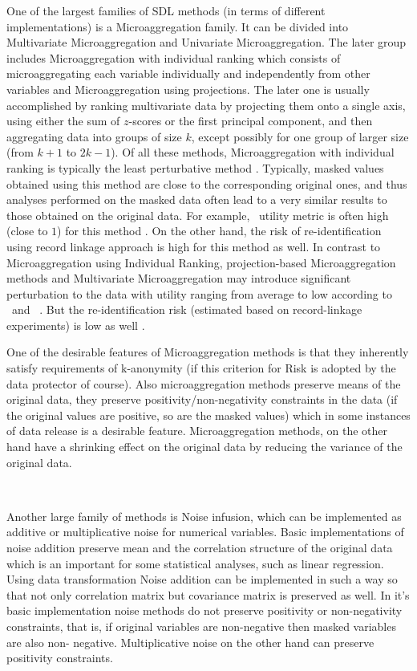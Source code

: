 \documentclass[12pt]{article}
\begin{document}
One of the largest families of SDL methods (in terms of different  implementations) is a  Microaggregation family. It can   be divided into Multivariate Microaggregation   and  Univariate Microaggregation. The later group includes Microaggregation with individual ranking which consists of microaggregating each variable individually and independently from other variables and Microaggregation using projections. The later one is usually accomplished by ranking  multivariate data by projecting them onto a single axis, using either the sum of $z$-scores or the first principal component, and then aggregating data into groups of size $k$, except possibly for one group of larger size (from $k+1$ to $2k -1$).
Of all these methods, Microaggregation with individual ranking is typically the least perturbative method \citep{kkors06}. Typically, masked values obtained using this method are close to the corresponding original ones, and thus analyses performed on the masked data often lead to a very similar results to those obtained on the original data. For example, \EO\ utility metric is often high (close to $1$)  for this method \citep{kkors06}. On the other hand, the risk of re-identification using record linkage approach is high for this method as well. 
In contrast to Microaggregation using Individual Ranking, projection-based Microaggregation methods and Multivariate Microaggregation may introduce significant perturbation to the data with utility ranging from average to low according to \IO\ and \EO\ . But the re-identification risk (estimated based on record-linkage experiments) is low as well \citep{}. 

One of the desirable features of Microaggregation methods is that they  inherently satisfy requirements of k-anonymity (if this criterion for Risk  is adopted by the data protector of course). Also microaggregation methods preserve means of the original data, they preserve positivity/non-negativity  constraints in the data (if the original values are positive, so are the masked values)  which in some instances of data release  is a desirable feature. Microaggregation methods, on the other hand have a shrinking effect on the original data by reducing  the variance of the original data.
 
 $ $ 

Another large family of methods is Noise infusion, which can be implemented as additive or multiplicative noise for numerical variables.
Basic implementations of noise addition preserve  mean and the correlation structure of the original data which is an important for some statistical analyses, such as linear regression. Using data transformation Noise addition can be implemented in such a way so that not only correlation matrix  but covariance matrix is preserved as well.
 In it's basic implementation noise methods do not preserve positivity or non-negativity constraints, that is, if original variables are non-negative then masked variables are also non- negative. Multiplicative noise on the other hand can preserve positivity constraints.
 
\end{document}
